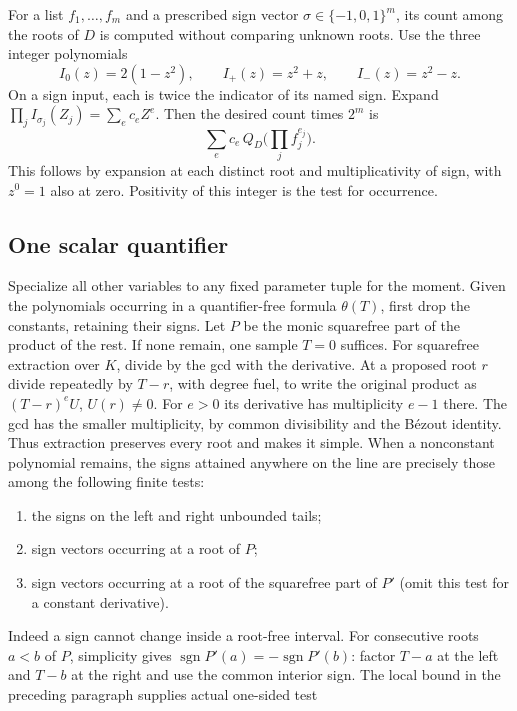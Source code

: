 For a list $f_1,\ldots,f_m$ and a prescribed sign vector
$\sigma\in\{-1,0,1\}^m$, its count among the roots of $D$ is computed
without comparing unknown roots. Use the three integer polynomials
\[
 I_0(z)=2(1-z^2),\qquad I_{+}(z)=z^2+z,\qquad I_{-}(z)=z^2-z .
\]
On a sign input, each is twice the indicator of its named sign. Expand
$\prod_j I_{\sigma_j}(Z_j)=\sum_e c_e Z^e$. Then the desired count times
$2^m$ is
\begin{equation}
             \sum_e c_e\, Q_D\Big(\prod_j f_j^{e_j}\Big).      \label{eq:counts}
\end{equation}
This follows by expansion at each distinct root and multiplicativity of
sign, with $z^0=1$ also at zero. Positivity of this integer is the
test for occurrence.

\subsection{One scalar quantifier}
Specialize all other variables to any fixed parameter tuple for the
moment. Given the polynomials occurring in a quantifier-free formula
$\theta(T)$, first drop the constants, retaining their signs. Let $P$ be
the monic squarefree part of the product of the rest. If none remain,
one sample $T=0$ suffices. For squarefree extraction over $K$, divide by the gcd with the derivative. At a proposed root $r$ divide repeatedly by $T-r$, with degree fuel, to write the original product as $(T-r)^e U$, $U(r)\ne0$. For $e>0$ its derivative has multiplicity $e-1$ there. The gcd has the smaller multiplicity, by common divisibility and the B\'ezout identity. Thus extraction preserves every root and makes it simple. When a nonconstant polynomial remains, the signs attained anywhere on
the line are precisely those among the following finite tests:
\begin{enumerate}
\item the signs on the left and right unbounded tails;
\item sign vectors occurring at a root of $P$;
\item sign vectors occurring at a root of the squarefree part of $P'$
(omit this test for a constant derivative).
\end{enumerate}
Indeed a sign cannot change inside a root-free interval. For consecutive
roots $a<b$ of $P$, simplicity gives
$\operatorname{sgn}P'(a)=-\operatorname{sgn}P'(b)$: factor $T-a$ at the
left and $T-b$ at the right and use the common interior sign. The
local bound in the preceding paragraph supplies actual one-sided test
